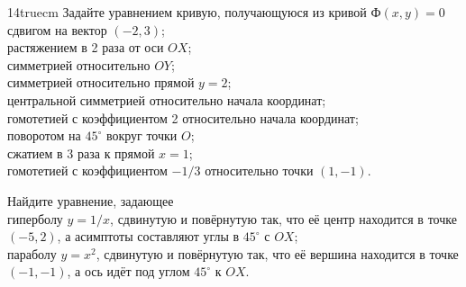 \documentclass[a4paper,12pt]{article}
\begin{document}





\vspace*{-1truemm}

{\hsize 14truecm
Задайте уравнением кривую, получающуюся
из %
кривой $Ф(x,y)=0$\\
сдвигом на вектор $(-2,3)$;\\
 растяжением в 2 раза от оси $OX$;\\
 симметрией относительно %
$OY$;\\
 симметрией относительно прямой $y=2$;\\
 центральной симметрией относительно начала координат;\\
 гомотетией с коэффициентом 2 относительно начала координат;\\
 поворотом на $45^{\circ}$ вокруг точки $O$;\\ %
 сжатием в 3 раза к прямой $x=1$;\\
 гомотетией с коэффициентом $-1/3$ относительно точки $(1,-1)$.

}

Найдите уравнение, задающее\\
гиперболу  $y=1/x$, сдвинутую и пов\"ернутую так, что е\"е центр
находится в точке $(-5,2)$, а асимптоты соста\-вляют углы в $45^{\circ}$ с
$OX$;\\
параболу $y=x^2$, сдвинутую и пов\"ернутую так, что е\"е вершина
находится в точке $(-1,-1)$, а ось ид\"ет под углом  $45^{\circ}$ к %
$OX$.


\vspace*{-7mm}



\end{document}
